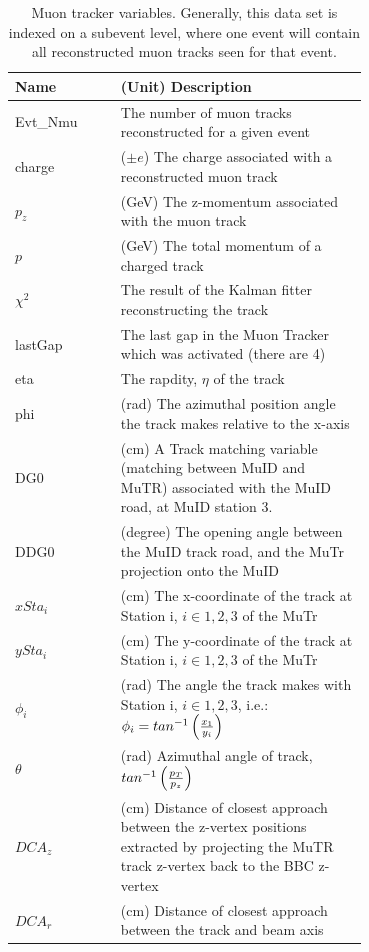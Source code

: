 \begin{table}[ht]
  \centering
  \begin{tabular}{l p{0.7\linewidth}}
    \toprule
    \textbf{Name} & \textbf{(Unit) Description} \\
    \midrule
    Evt\_Nmu & The number of muon tracks reconstructed for a given event \\
    charge & ($\pm e$) The charge associated with a reconstructed muon track \\ 
    $p_z$ & (GeV) The z-momentum associated with the muon track \\
    $p$ & (GeV) The total momentum of a charged track \\
    $\chi^2$ & The result of the Kalman fitter reconstructing the track \\
    lastGap & The last gap in the Muon Tracker which was activated (there are 4) \\
    eta & The rapdity, $\eta$ of the track \\
    phi & (rad) The azimuthal position angle the track makes relative to the x-axis \\
    DG0 & (cm) A Track matching variable (matching between MuID and MuTR) associated with the MuID road, at MuID station 3. \\
    DDG0 & (degree)  The opening angle between the MuID track road, and the MuTr projection onto the MuID \\
    $xSta_i$ & (cm) The x-coordinate of the track at Station i,  $i\in{1,2,3}$ of the MuTr \\
    $ySta_i$ & (cm) The y-coordinate of the track at Station i, $i\in{1,2,3}$ of the MuTr \\

    $\phi_i$ & (rad) The angle the track makes with Station i, $i\in{1,2,3}$, i.e.: $\phi_i = tan^{-1}\left({{x_1}\over{y_i}}\right)$ \\
    $\theta$ & (rad) Azimuthal angle of track, $tan^{-1}\left({p_T \over p_z}\right)$ \\
    $DCA_z$ & (cm) Distance of closest approach between the z-vertex positions extracted by projecting the MuTR track z-vertex back to the BBC z-vertex \\
    $DCA_r$ & (cm) Distance of closest approach between the track and beam axis \\ 
    \bottomrule
  \end{tabular}
  \caption{
    Muon tracker variables. Generally, this data set is indexed on a subevent 
    level, where one event will contain all reconstructed muon tracks seen for 
    that event.
  }
  \label{tab:mutr_variables}
\end{table}

